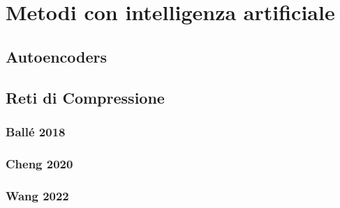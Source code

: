 \chapter{Metodi con intelligenza artificiale}

\section{Autoencoders}

\section{Reti di Compressione}

\subsection{Ballé 2018}

\subsection{Cheng 2020}

\subsection{Wang 2022}


